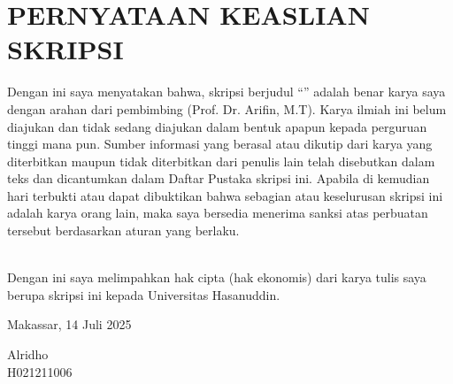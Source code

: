 \begingroup
\singlespacing
\chapter*{PERNYATAAN KEASLIAN SKRIPSI}
\noindent
Dengan ini saya menyatakan bahwa, skripsi berjudul “\textbf{\JudulSkripsi}”
adalah benar karya saya dengan arahan dari pembimbing (Prof. Dr.
Arifin, M.T). Karya ilmiah ini belum diajukan dan tidak sedang
diajukan dalam bentuk apapun kepada perguruan tinggi mana pun. Sumber
informasi yang berasal atau dikutip dari karya yang diterbitkan
maupun tidak diterbitkan dari penulis lain telah disebutkan dalam
teks dan dicantumkan dalam Daftar Pustaka skripsi ini. Apabila di
kemudian hari terbukti atau dapat dibuktikan bahwa sebagian atau
keselurusan skripsi ini adalah karya orang lain, maka saya bersedia
menerima sanksi atas perbuatan tersebut berdasarkan aturan yang berlaku. \par

\noindent
\\
Dengan ini saya melimpahkan hak cipta (hak ekonomis) dari karya tulis
saya berupa skripsi ini kepada Universitas Hasanuddin. \par

\vspace{2cm}

\hfill
\begin{minipage}{0.4\textwidth}
  \raggedleft
  Makassar, 14 Juli 2025 \par
  \vspace{2cm}
  Alridho \\
  H021211006
\end{minipage}
\endgroup
